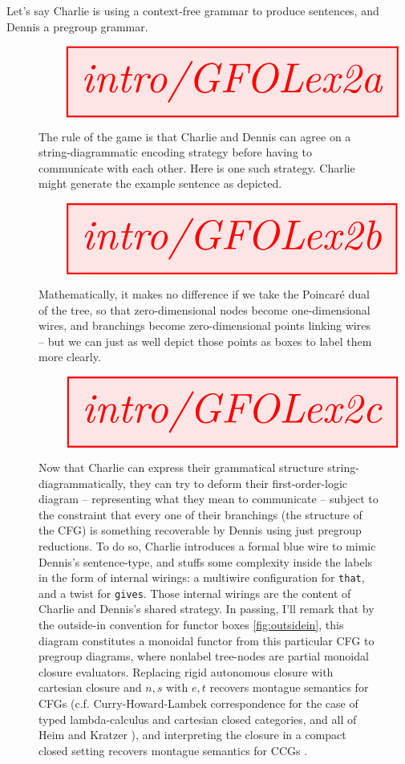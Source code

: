 \begin{example} Let's say Charlie is using a context-free grammar to produce sentences, and Dennis a pregroup grammar. \\

\begin{figure}[h!]\label{fig:GFOLex2a}
\centering
\[\resizebox{\textwidth}{!}{\tikzfig{intro/GFOLex2a}}\]
\caption{The rule of the game is that Charlie and Dennis can agree on a string-diagrammatic encoding strategy before having to communicate with each other. Here is one such strategy. Charlie might generate the example sentence as depicted.}
\end{figure}

\begin{figure}[h!]\label{fig:GFOLex2b}
\centering
\[\resizebox{\textwidth}{!}{\tikzfig{intro/GFOLex2b}}\]
\caption{Mathematically, it makes no difference if we take the Poincar\'{e} dual of the tree, so that zero-dimensional nodes become one-dimensional wires, and branchings become zero-dimensional points linking wires -- but we can just as well depict those points as boxes to label them more clearly.}
\end{figure}

\begin{figure}[h!]\label{fig:GFOLex2c}
\centering
\[\resizebox{\textwidth}{!}{\tikzfig{intro/GFOLex2c}}\]
\caption{Now that Charlie can express their grammatical structure string-diagrammatically, they can try to deform their first-order-logic diagram -- representing what they mean to communicate -- subject to the constraint that every one of their branchings (the structure of the CFG) is something recoverable by Dennis using just pregroup reductions. To do so, Charlie introduces a formal blue wire to mimic Dennis's sentence-type, and stuffs some complexity inside the labels in the form of internal wirings: a multiwire configuration for \texttt{that}, and a twist for \texttt{gives}. Those internal wirings are the content of Charlie and Dennis's shared strategy. In passing, I'll remark that by the outside-in convention for functor boxes \ref{fig:outsidein}, this diagram constitutes a monoidal functor from this particular CFG to pregroup diagrams, where nonlabel tree-nodes are partial monoidal closure evaluators. Replacing rigid autonomous closure with cartesian closure and $n,s$ with $e,t$ recovers montague semantics for CFGs (c.f. Curry-Howard-Lambek correspondence for the case of typed lambda-calculus and cartesian closed categories, and all of Heim and Kratzer \citep{heim_semantics_1998}), and interpreting the closure in a compact closed setting recovers montague semantics for CCGs \citep{yeung_ccg-based_2021}.}
\end{figure}


\end{example}
